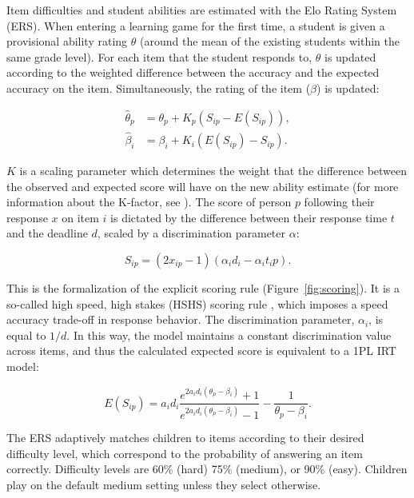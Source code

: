 \documentclass{edm_article}
\begin{document}
Item difficulties and student abilities are estimated with the Elo Rating System (ERS). When entering a learning game for the first time, a student is given a provisional ability rating $\theta$ (around the mean of the existing students within the same grade level). For each item that the student responds to, $\theta$ is updated according to the weighted difference between the accuracy and the expected accuracy on the item. Simultaneously, the rating of the item ($\beta$) is updated: 

\begin{align}
    \hat{\theta}_p &= \theta_p + K_p(S_{ip} - E(S_{ip})), \\
    \hat{\beta}_i &= \beta_i + K_i(E(S_{ip}) - S_{ip}).
\end{align}

\noindent $K$ is a scaling parameter which determines the weight that the difference between the observed and expected score will have on the new ability estimate (for more information about the K-factor, see \cite{vermeiren2024balancing}). The score of person $p$ following their response $x$ on item $i$ is dictated by the difference between their response time $t$ and the deadline $d$, scaled by a discrimination parameter $\alpha$:

\begin{equation}
    S_{ip} = (2x_{ip} - 1)(\alpha_id_i - \alpha_it_ip).
    \label{eq:scoring}
\end{equation}

\noindent This is the formalization of the explicit scoring rule (Figure~\ref{fig:scoring}). It is a so-called high speed, high stakes (HSHS) scoring rule \cite{maris2012speed}, which imposes a speed accuracy trade-off in response behavior. The discrimination parameter, $\alpha_i$, is equal to $1/d$. In this way, the model maintains a constant discrimination value across items, and thus the calculated expected score is equivalent to a 1PL IRT model: 

\begin{equation}
    E(S_{ip}) = a_i d_i \frac{e^{2 a_i d_i (\theta_p - \beta_i)} + 1}{e^{2 a_i d_i (\theta_p - \beta_i)} - 1} - \frac{1}{\theta_p - \beta_i}.
\end{equation}

\noindent The ERS adaptively matches children to items according to their desired difficulty level, which correspond to the probability of answering an item correctly. Difficulty levels are 60\% (hard) 75\% (medium), or 90\% (easy). Children play on the default medium setting unless they select otherwise. 
\end{document}
